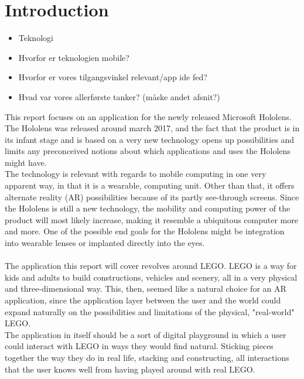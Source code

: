 
\section{Introduction}
\begin{itemize}
\item Teknologi
\item Hvorfor er teknologien mobile?
\item Hvorfor er vores tilgangsvinkel relevant/app ide fed?
\item Hvad var vores allerførste tanker? (måske andet afsnit?)
\end{itemize}

This report focuses on an application for the newly released Microsoft Hololens. The Hololens was released around march 2017, and the fact that the product is in its infant stage and is based on a very new technology opens up possibilities and limits any preconceived notions about which applications and uses the Hololens might have.\\
The technology is relevant with regards to mobile computing in one very apparent way, in that it is a wearable, computing unit. Other than that, it offers alternate reality (AR) possibilities because of its partly see-through screens. Since the Hololens is still a new technology, the mobility and computing power of the product will most likely increase, making it resemble a ubiquitous computer more and more. One of the possible end goals for the Hololens might be integration into wearable lenses or implanted directly into the eyes.\\\\
The application this report will cover revolves around LEGO. LEGO is a way for kids and adults to build constructions, vehicles and scenery, all in a very physical and three-dimensional way. This, then, seemed like a natural choice for an AR application, since the application layer between the user and the world could expand naturally on the possibilities and limitations of the physical, "real-world" LEGO.\\
The application in itself should be a sort of digital playground in which a user could interact with LEGO in ways they would find natural. Sticking pieces together the way they do in real life, stacking and constructing, all interactions that the user knows well from having played around with real LEGO. 